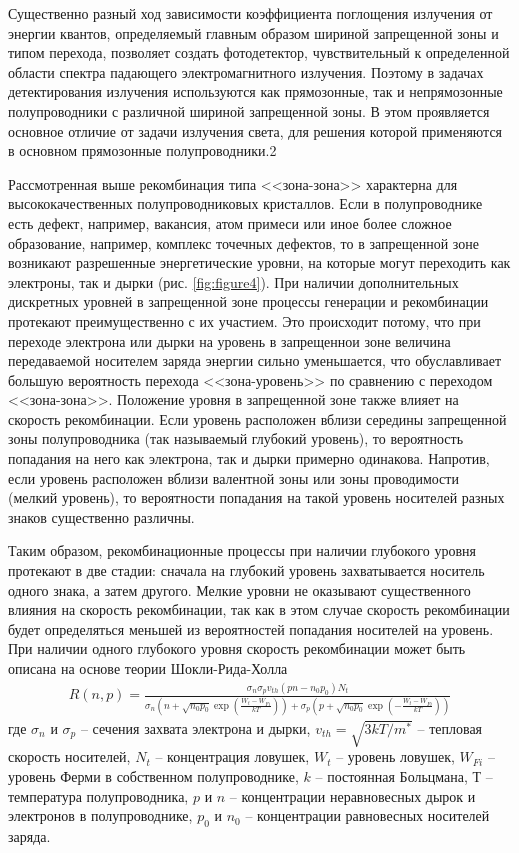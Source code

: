 Существенно разный ход зависимости коэффициента поглощения излучения от энергии квантов, определяемый главным образом шириной запрещенной зоны и типом перехода, позволяет создать фотодетектор, чувствительный к определенной области спектра падающего электромагнитного излучения. Поэтому в задачах детектирования излучения используются как прямозонные, так и непрямозонные полупроводники с различной шириной запрещенной зоны. В этом проявляется основное отличие от задачи излучения света, для решения которой применяются в основном прямозонные полупроводники.2

Рассмотренная выше рекомбинация типа <<зона-зона>> характерна для высококачественных полупроводниковых кристаллов. Если в полупроводнике есть дефект, например, вакансия, атом примеси или иное более сложное образование, например, комплекс точечных дефектов, то в запрещенной зоне возникают разрешенные энергетические уровни, на которые могут переходить как электроны, так и дырки (рис. \ref{fig:figure4}). При наличии дополнительных дискретных уровней в запрещенной зоне процессы генерации и рекомбинации протекают преимущественно с их участием. Это происходит потому, что при переходе электрона или дырки на уровень в запрещеннои зоне величина передаваемой носителем заряда энергии сильно уменьшается, что обуславливает большую вероятность перехода <<зона-уровень>> по сравнению с переходом <<зона-зона>>. Положение уровня в запрещенной зоне также влияет на скорость рекомбинации. Если уровень расположен вблизи середины запрещенной зоны полупроводника (так называемый глубокий уровень), то вероятность попадания на него как электрона, так и дырки примерно одинакова. Напротив, если уровень расположен вблизи валентной зоны или зоны проводимости (мелкий уровень), то вероятности попадания на такой уровень носителей разных знаков существенно различны.

Таким образом, рекомбинационные процессы при наличии глубокого уровня протекают в две стадии: сначала на глубокий уровень захватывается носитель одного знака, а затем другого. Мелкие уровни не оказывают существенного влияния на скорость рекомбинации, так как в этом случае скорость рекомбинации будет определяться меньшей из вероятностей попадания носителей на уровень. При наличии одного глубокого уровня скорость рекомбинации может быть описана на основе теории Шокли-Рида-Холла
\begin{gather}
	\label{eq4}
	R(n, p)=\frac{\sigma_{n} \sigma_{p} v_{t h}\left(p n-n_{0} p_{0}\right) N_{t}}{\sigma_{n}\left(n+\sqrt{n_{0} p_{0}} \exp \left(\frac{W_{t}-W_{F i}}{k T}\right)\right)+\sigma_{p}\left(p+\sqrt{n_{0} p_{0}} \exp \left(-\frac{W_{t}-W_{F i}}{k T}\right)\right)}
\end{gather}
где $\sigma_{n}$ и $\sigma_{p}$ -- сечения захвата электрона и дырки, $v_{th}=\sqrt{3kT/m^*}$ -- тепловая скорость носителей, $N_t$ -- концентрация ловушек, $W_t$ -- уровень ловушек, $W_{Fi}$ -- уровень Ферми в собственном полупроводнике, $k$ -- постоянная Больцмана, $Т$ -- температура полупроводника, $p$ и $n$ -- концентрации неравновесных дырок и электронов в полупроводнике, $p_0$ и $n_0$ -- концентрации равновесных носителей заряда.

